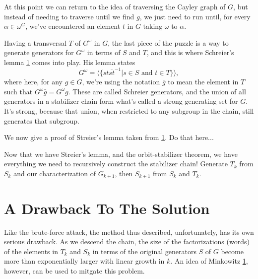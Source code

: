 \documentclass[12pt]{article}
\begin{document}
At this point we can return to the idea of traversing the Cayley graph of $G$,
but instead of needing to traverse until we find $g$, we just need to run until,
for every $\alpha\in\omega^G$,
we've encountered an element $t$ in $G$ taking $\omega$ to $\alpha$.

Having a transversal $T$ of $G^\omega$ in $G$, the last piece of the
puzzle is a way to generate generators for $G^\omega$ in terms
of $S$ and $T$, and this is where Schreier's lemma \ref{} comes into play.
His lemma states
\begin{equation*}
G^{\omega} = \langle\{st\overline{st}^{-1}|\mbox{$s\in S$ and $t\in T$}\}\rangle,
\end{equation*}
where here, for any $g\in G$, we're using the notation $\bar{g}$ to
mean the element in $T$ such that $G^\omega\bar{g}=G^\omega g$.
These are called Schreier generators, and the union of all generators in
a stabilizer chain form what's called a strong generating set for $G$.
It's strong, because that union, when restricted to any subgroup in
the chain, still generates that subgroup.

We now give a proof of Streier's lemma taken from \ref{}.  Do that here...

Now that we have Streier's lemma, and the orbit-stabilizer theorem, we have everything
we need to recursively construct the stabilizer chain!  Generate $T_k$ from
$S_k$ and our characterization of $G_{k+1}$, then $S_{k+1}$ from $S_k$ and $T_k$.

\section{A Drawback To The Solution}

Like the brute-force attack, the method thus described, unfortunately, has its
own serious drawback.  As we descend the chain, the size of the factorizations
(words) of the elements in $T_k$ and $S_k$ in terms of the original generators
$S$ of $G$ become more than exponentially larger with linear growth in $k$.
An idea of Minkowitz \ref{}, however, can be used to mitgate this problem.
\end{document}
